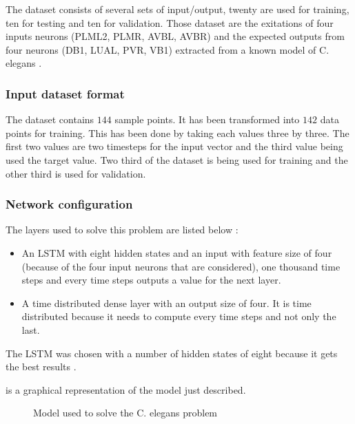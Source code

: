 The dataset consists of several sets of input/output, twenty are used for training, ten for testing and ten for validation. Those dataset are the exitations of four inputs neurons (PLML2, PLMR, AVBL, AVBR) and the expected outputs from four neurons (DB1, LUAL, PVR, VB1) extracted from a known model of \ac{C. elegans} \cite{celegans}.

\subsubsection{Input dataset format}

The dataset contains $144$ sample points. It has been transformed into $142$ data points for training. This has been done by taking each values three by three. The first two values are two timesteps for the input vector and the third value being used the target value. Two third of the dataset is being used for training and the other third is used for validation.

\subsubsection{Network configuration}

The layers used to solve this problem are listed below :

\begin{itemize}
  \item An \ac{LSTM} with eight hidden states and an input with feature size of four (because of the four input neurons that are considered), one thousand time steps and every time steps outputs a value for the next layer.
  \item A time distributed dense layer with an output size of four. It is time distributed because it needs to compute every time steps and not only the last.
\end{itemize}

The \ac{LSTM} was chosen with a number of hidden states of eight because it gets the best results \cite{celegans}.

 is a graphical representation of the model just described.

\begin{figure}[H]
  \centering
  
  \caption{Model used to solve the \ac{C. elegans} problem}
  \label{fig:celegansModel}
\end{figure}
